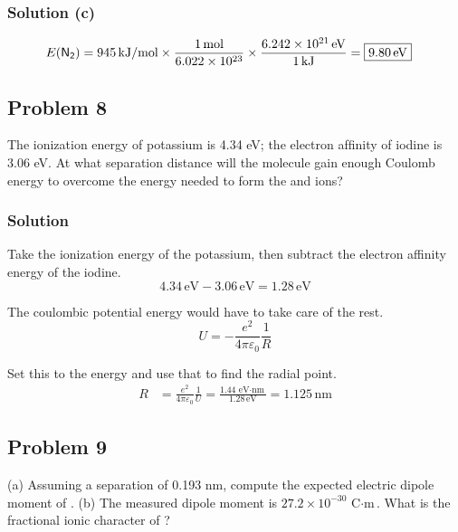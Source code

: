 \documentclass[12pt]{article}
\newcommand{\E}[1]{\times 10^{#1}}
\begin{document}
        \subsubsection{Solution (c)}
            \begin{align}
                E(\ce{N2})  &=  945\,\unit{\kilo\joule/\mole} \times \frac{1\,\unit{\mole}}{6.022\E{23}} \times \frac{6.242\E{21}\,\unit{\eV}}{1\,\unit{\kilo\joule}}
                    =   \boxed{9.80\,\unit{\eV}}
            \end{align}
        
    \pagebreak
    \subsection{Problem 8}
        The ionization energy of potassium is 4.34 eV; the electron afﬁnity of iodine is 3.06 eV. 
        At what separation distance will the  molecule gain enough Coulomb energy to overcome the energy needed to form the  and  ions?

        \subsubsection{Solution}
            Take the ionization energy of the potassium, then subtract the electron affinity energy of the iodine.
            \begin{equation}
                4.34\,\unit{\eV} - 3.06\,\unit{\eV} = 1.28\,\unit{\eV}
            \end{equation}

            The coulombic potential energy would have to take care of the rest.
            \begin{equation}
                U   =   -\frac{e^2}{4\pi\varepsilon_0} \frac{1}{R}
            \end{equation}

            Set this to the energy and use that to find the radial point.
            \begin{align}
                R   &=  \frac{e^2}{4\pi\varepsilon_0} \frac{1}{U}
                    =   \frac{1.44\,\unit{\eV\cdot\nano\meter}}{1.28\,\unit{\eV}}
                    =   \boxed{1.125\,\unit{\nano\meter}}
            \end{align}
        
    \subsection{Problem 9}
        (a) Assuming a separation of 0.193 nm, compute the expected electric dipole moment of . 
        (b) The measured dipole moment is $27.2\E{-30}\,\unit{\coulomb\cdot\meter}$. 
        What is the fractional ionic character of ?
\end{document}
